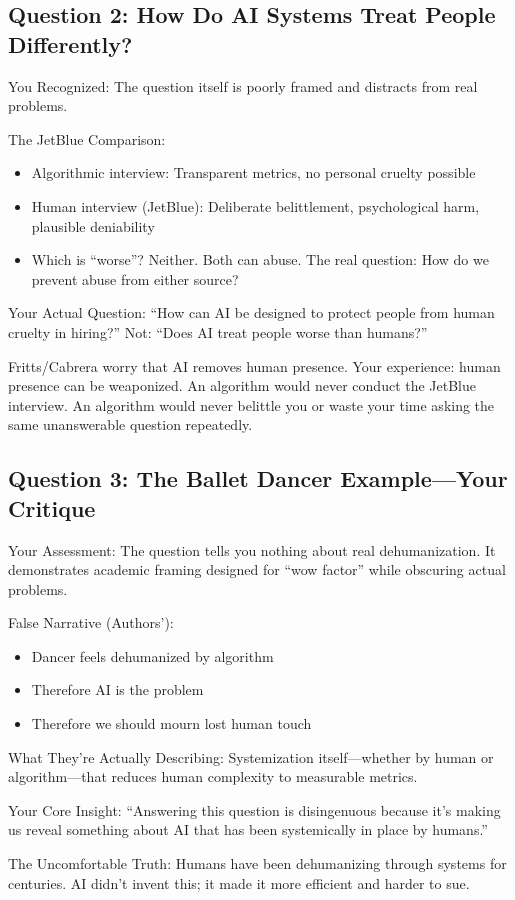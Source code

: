 \documentclass[12pt,letterpaper]{article}
\begin{document}
\subsection{Question 2: How Do AI Systems Treat People Differently?}

\begin{livedexperience}
You Recognized: The question itself is poorly framed and distracts from real problems.

The JetBlue Comparison:
\begin{itemize}
\item Algorithmic interview: Transparent metrics, no personal cruelty possible
\item Human interview (JetBlue): Deliberate belittlement, psychological harm, plausible deniability
\item Which is ``worse''? Neither. Both can abuse. The real question: How do we prevent abuse from either source?
\end{itemize}

Your Actual Question: ``How can AI be designed to protect people from human cruelty in hiring?'' Not: ``Does AI treat people worse than humans?''
\end{livedexperience}

Fritts/Cabrera worry that AI removes human presence. Your experience: human presence can be weaponized. An algorithm would never conduct the JetBlue interview. An algorithm would never belittle you or waste your time asking the same unanswerable question repeatedly.

\subsection{Question 3: The Ballet Dancer Example---Your Critique}

\begin{livedexperience}
Your Assessment: The question tells you nothing about real dehumanization. It demonstrates academic framing designed for ``wow factor'' while obscuring actual problems.

False Narrative (Authors'):
\begin{itemize}
\item Dancer feels dehumanized by algorithm
\item Therefore AI is the problem
\item Therefore we should mourn lost human touch
\end{itemize}

What They're Actually Describing: Systemization itself---whether by human or algorithm---that reduces human complexity to measurable metrics.

Your Core Insight: ``Answering this question is disingenuous because it's making us reveal something about AI that has been systemically in place by humans.''

The Uncomfortable Truth: Humans have been dehumanizing through systems for centuries. AI didn't invent this; it made it more efficient and harder to sue.
\end{livedexperience}
\end{document}
